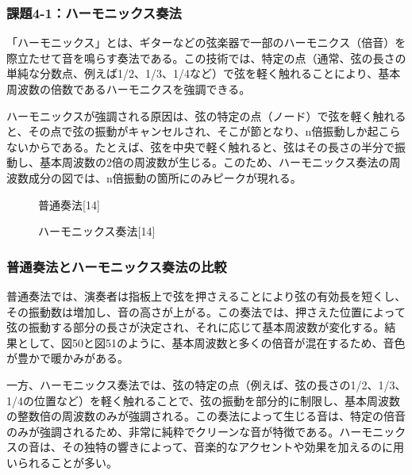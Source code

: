 \documentclass{article}
\begin{document}
\newpage
\subsubsection{課題4-1：ハーモニックス奏法}
\begin{spacing}{1.2}
    「ハーモニックス」とは、ギターなどの弦楽器で一部のハーモニクス（倍音）を際立たせて音を鳴らす奏法である。この技術では、特定の点（通常、弦の長さの単純な分数点、例えば1/2、1/3、1/4など）で弦を軽く触れることにより、基本周波数の倍数であるハーモニクスを強調できる。

    ハーモニックスが強調される原因は、弦の特定の点（ノード）で弦を軽く触れると、その点で弦の振動がキャンセルされ、そこが節となり、n倍振動しか起こらないからである。たとえば、弦を中央で軽く触れると、弦はその長さの半分で振動し、基本周波数の2倍の周波数が生じる。このため、ハーモニックス奏法の周波数成分の図では、n倍振動の箇所にのみピークが現れる。
    \begin{figure}[htbp]
        \centering
        \begin{minipage}[b]{0.49\textwidth} %
          \centering
          \caption{普通奏法[14]}
        \end{minipage}%
        \begin{minipage}[b]{0.49\textwidth}
          \centering
          \caption{ハーモニックス奏法[14]}
        \end{minipage}
    \end{figure}
    \FloatBarrier
    \subsubsection*{普通奏法とハーモニックス奏法の比較}
    普通奏法では、演奏者は指板上で弦を押さえることにより弦の有効長を短くし、その振動数は増加し、音の高さが上がる。この奏法では、押さえた位置によって弦の振動する部分の長さが決定され、それに応じて基本周波数が変化する。結果として、図50と図51のように、基本周波数と多くの倍音が混在するため、音色が豊かで暖かみがある。

    一方、ハーモニックス奏法では、弦の特定の点（例えば、弦の長さの1/2、1/3、1/4の位置など）を軽く触れることで、弦の振動を部分的に制限し、基本周波数の整数倍の周波数のみが強調される。この奏法によって生じる音は、特定の倍音のみが強調されるため、非常に純粋でクリーンな音が特徴である。ハーモニックスの音は、その独特の響きによって、音楽的なアクセントや効果を加えるのに用いられることが多い。
\end{spacing}
\end{document}
